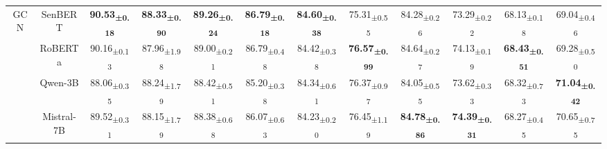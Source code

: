 \begin{table*}[!h]
{\begin{tabular}{cc|cccccccccc}
    \multirow{4}{*}{GCN} & SenBERT & 
    \cellcolor{blue!10}
    \textbf{90.53\textsubscript{±0.18}} & \cellcolor{blue!10} \textbf{88.33\textsubscript{±0.90}} & \cellcolor{blue!10} \textbf{89.26\textsubscript{±0.24}} & \cellcolor{blue!10} \textbf{86.79\textsubscript{±0.18}} & \cellcolor{blue!10} \textbf{84.60\textsubscript{±0.38}} & 75.31\textsubscript{±0.55} & 84.28\textsubscript{±0.26} & 73.29\textsubscript{±0.22} & 68.13\textsubscript{±0.18} & 69.04\textsubscript{±0.46}\\ 
     & RoBERTa & 90.16\textsubscript{±0.13} & 87.96\textsubscript{±1.98} & 89.00\textsubscript{±0.21} & 86.79\textsubscript{±0.48} & 84.42\textsubscript{±0.38} & \cellcolor{blue!10} \textbf{76.57\textsubscript{±0.99}} & 84.64\textsubscript{±0.27} & 74.13\textsubscript{±0.19} & \cellcolor{blue!10} \textbf{68.43\textsubscript{±0.51}} & 69.28\textsubscript{±0.50} \\ 
     & Qwen-3B & 88.06\textsubscript{±0.35} & 88.24\textsubscript{±1.79} & 88.42\textsubscript{±0.51} & 85.20\textsubscript{±0.38} & 84.34\textsubscript{±0.61} & 76.37\textsubscript{±0.97} & 84.05\textsubscript{±0.55} & 73.62\textsubscript{±0.33} & 68.32\textsubscript{±0.73} & \cellcolor{blue!10} \textbf{71.04\textsubscript{±0.42}} \\ 
    & Mistral-7B & 89.52\textsubscript{±0.31} & 88.15\textsubscript{±1.79} & 88.38\textsubscript{±0.68} & 86.07\textsubscript{±0.63} & 84.23\textsubscript{±0.20} & 76.45\textsubscript{±1.19} & \cellcolor{blue!10} \textbf{84.78\textsubscript{±0.86}} & \cellcolor{blue!10} \textbf{74.39\textsubscript{±0.31}} & 68.27\textsubscript{±0.45} & 70.65\textsubscript{±0.75} \\ \midrule
    

\end{tabular}}
\end{table*}
